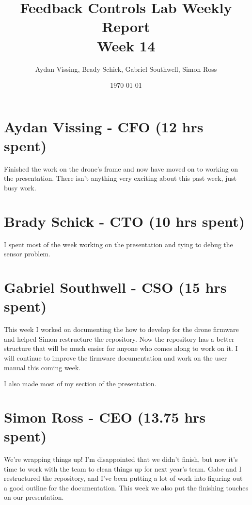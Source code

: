 \documentclass[12pt, titlepage]{article}
\title{Feedback Controls Lab Weekly Report \\ \normalsize{Week 14}}
\author{Aydan Vissing, Brady Schick, Gabriel Southwell, Simon Ross}
\date{\today}
\begin{document}
\maketitle

\section*{Aydan Vissing - CFO (12 hrs spent)}

Finished the work on the drone's frame and now have moved on to working on the presentation. There isn't anything very exciting about this past week, just busy work. 

\section*{Brady Schick - CTO (10 hrs spent)}

I spent most of the week working on the presentation and tying to debug the sensor problem.

\section*{Gabriel Southwell - CSO (15 hrs spent)}

This week I worked on documenting the how to develop for the drone firmware and helped Simon restructure the repository. Now the repository has a better structure that will be much easier for anyone who comes along to work on it. I will continue to improve the firmware documentation and work on the user manual this coming week.

I also made most of my section of the presentation.

\section*{Simon Ross - CEO (13.75 hrs spent)}

We're wrapping things up! I'm disappointed that we didn't finish, but now it's time to work with the team to clean things up for next year's team. Gabe and I restructured the repository, and I've been putting a lot of work into figuring out a good outline for the documentation. This week we also put the finishing touches on our presentation.
\end{document}
